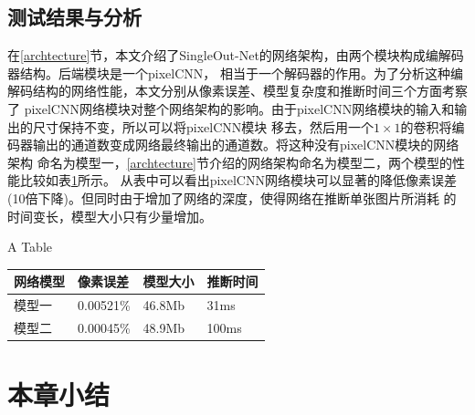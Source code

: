 \subsection{测试结果与分析}
	 在\ref{archtecture}节，本文介绍了SingleOut-Net的网络架构，由两个模块构成编解码器结构。后端模块是一个pixelCNN，
	 相当于一个解码器的作用。为了分析这种编解码结构的网络性能，本文分别从像素误差、模型复杂度和推断时间三个方面考察了
	 pixelCNN网络模块对整个网络架构的影响。由于pixelCNN网络模块的输入和输出的尺寸保持不变，所以可以将pixelCNN模块
	 移去，然后用一个$1\times1$的卷积将编码器输出的通道数变成网络最终输出的通道数。将这种没有pixelCNN模块的网络架构
	 命名为模型一，\ref{archtecture}节介绍的网络架构命名为模型二，两个模型的性能比较如表\ref{tab:performance}所示。
	 从表中可以看出pixelCNN网络模块可以显著的降低像素误差(10倍下降)。但同时由于增加了网络的深度，使得网络在推断单张图片所消耗
	 的时间变长，模型大小只有少量增加。
\begin{table}[!hpb]
	\centering
    {A Table}
	\label{tab:performance}
	\begin{tabular}{llll}
	\toprule
	网络模型 & 像素误差 & 模型大小 & 推断时间 \\
	\midrule
	模型一 &  0.00521\% & 46.8Mb & 31ms \\
	模型二 & 0.00045\% & 48.9Mb & 100ms \\
	\bottomrule
\end{tabular}
\end{table}
	 
\section{本章小结}
	
	



